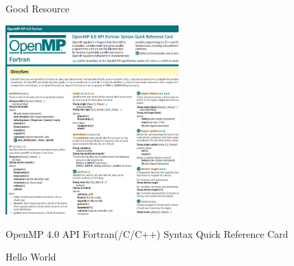 \documentclass[10pt]{beamer}
\begin{document}
\begin{frame}{Good Resource}

\includegraphics[width=0.5\textwidth]{omp_cheat.png}

{\tiny OpenMP 4.0 API Fortran(/C/C++) Syntax Quick Reference Card}

\end{frame}

\begin{frame}{Hello World}

\begin{columns}[c]
  \begin{column}{0.5\textwidth}
    
  \end{column}
  \begin{column}{0.5\textwidth}
    
  \end{column}
\end{columns}

\end{frame}
\end{document}
